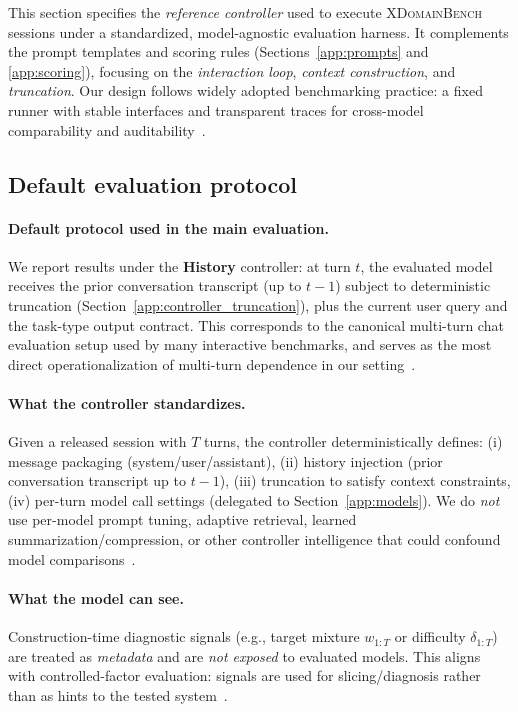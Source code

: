 This section specifies the \emph{reference controller} used to execute \textsc{XDomainBench} sessions under a standardized, model-agnostic evaluation harness.
It complements the prompt templates and scoring rules (Sections~\ref{app:prompts} and \ref{app:scoring}), focusing on the \emph{interaction loop}, \emph{context construction}, and \emph{truncation}.
Our design follows widely adopted benchmarking practice: a fixed runner with stable interfaces and transparent traces for cross-model comparability and auditability~\citep{liang2022helm,eval-harness,chang-etal-2023-survey}.

\subsection{Default evaluation protocol}
\label{app:controller_default}

\paragraph{Default protocol used in the main evaluation.}
We report results under the \textbf{History} controller: at turn $t$, the evaluated model receives the prior conversation transcript (up to $t-1$) subject to deterministic truncation (Section~\ref{app:controller_truncation}), plus the current user query and the task-type output contract. This corresponds to the canonical multi-turn chat evaluation setup used by many interactive benchmarks, and serves as the most direct operationalization of multi-turn dependence in our setting~\citep{liu2023agentbench,zhou2024webarena,chiang-etal-2024-chatbotarena}.

\paragraph{What the controller standardizes.}
Given a released session with $T$ turns, the controller deterministically defines:
(i) message packaging (system/user/assistant),
(ii) history injection (prior conversation transcript up to $t-1$),
(iii) truncation to satisfy context constraints,
(iv) per-turn model call settings (delegated to Section~\ref{app:models}).
We do \emph{not} use per-model prompt tuning, adaptive retrieval, learned summarization/compression, or other controller intelligence that could confound model comparisons~\citep{liang2022helm,eval-harness}.

\paragraph{What the model can see.}
Construction-time diagnostic signals (e.g., target mixture $w_{1:T}$ or difficulty $\delta_{1:T}$) are treated as \emph{metadata} and are \emph{not exposed} to evaluated models. This aligns with controlled-factor evaluation: signals are used for slicing/diagnosis rather than as hints to the tested system~\citep{kiela-etal-2021-dynabench,ribeiro-etal-2020-beyond,liang2022helm}.

